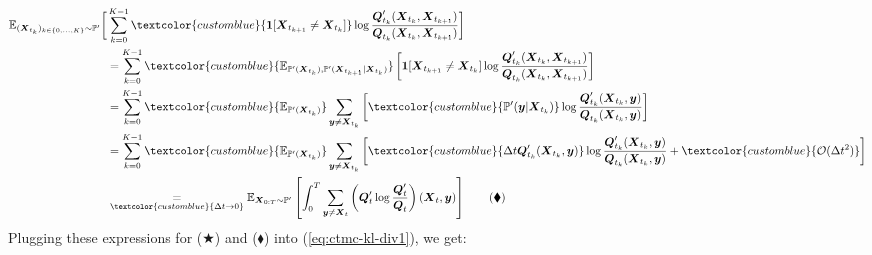 \documentclass{article}
\newcommand{\bluetext}[1]{\textcolor{customblue}{#1}}
\begin{document}
\begin{align}
    \mathbb{E}_{(\boldsymbol{X}_{t_k})_{k\in \{0,\dots, K\}}\sim \mathbb{P}'}\bigg[&\sum_{k=0}^{K-1}\bluetext{\boldsymbol{1}[\boldsymbol{X}_{t_{k+1}}\neq \boldsymbol{X}_{t_k}]}\log \frac{\boldsymbol{Q}_{t_k}'(\boldsymbol{X}_{t_k}, \boldsymbol{X}_{t_{k+1}})}{\boldsymbol{Q}_{t_k}(\boldsymbol{X}_{t_k}, \boldsymbol{X}_{t_{k+1}})}\bigg]\nonumber\\
    &=\sum_{k=0}^{K-1}\bluetext{\mathbb{E}_{\mathbb{P}'(\boldsymbol{X}_{t_k}), \mathbb{P}'(\boldsymbol{X}_{t_{k+1}}|\boldsymbol{X}_{t_k})}}\left[\boldsymbol{1}[\boldsymbol{X}_{t_{k+1}}\neq \boldsymbol{X}_{t_k}]\log \frac{\boldsymbol{Q}_{t_k}'(\boldsymbol{X}_{t_k}, \boldsymbol{X}_{t_{k+1}})}{\boldsymbol{Q}_{t_k}(\boldsymbol{X}_{t_k}, \boldsymbol{X}_{t_{k+1}})}\right]\nonumber\\
    &=\sum_{k=0}^{K-1}\bluetext{\mathbb{E}_{\mathbb{P}'(\boldsymbol{X}_{t_k})}}\sum_{\boldsymbol{y}\neq \boldsymbol{X}_{t_k}}\left[\bluetext{\mathbb{P}'(\boldsymbol{y}|\boldsymbol{X}_{t_k})}\log \frac{\boldsymbol{Q}_{t_k}'(\boldsymbol{X}_{t_k}, \boldsymbol{y})}{\boldsymbol{Q}_{t_k}(\boldsymbol{X}_{t_k}, \boldsymbol{y})}\right]\nonumber\\
    &=\sum_{k=0}^{K-1}\bluetext{\mathbb{E}_{\mathbb{P}'(\boldsymbol{X}_{t_k})}}\sum_{\boldsymbol{y}\neq \boldsymbol{X}_{t_k}}\left[\bluetext{\Delta t\boldsymbol{Q}_{t_k}'(\boldsymbol{X}_{t_k}, \boldsymbol{y})}\log \frac{\boldsymbol{Q}_{t_k}'(\boldsymbol{X}_{t_k}, \boldsymbol{y})}{\boldsymbol{Q}_{t_k}(\boldsymbol{X}_{t_k}, \boldsymbol{y})}+\bluetext{\mathcal{O}(\Delta t^2)}\right]\nonumber\\
    &\underset{\bluetext{\Delta t\to 0}}{=}\mathbb{E}_{\boldsymbol{X}_{0:T}\sim \mathbb{P}'}\left[\int_0^T\sum_{\boldsymbol{y}\neq \boldsymbol{X}_t}\left(\boldsymbol{Q}_t'\log \frac{\boldsymbol{Q}_{t}'}{\boldsymbol{Q}_{t}}\right)(\boldsymbol{X}_t, \boldsymbol{y})\right]\tag{$\blacklozenge$}
\end{align}
Plugging these expressions for ($\bigstar$) and ($\blacklozenge$) into (\ref{eq:ctmc-kl-div1}), we get:
\end{document}
